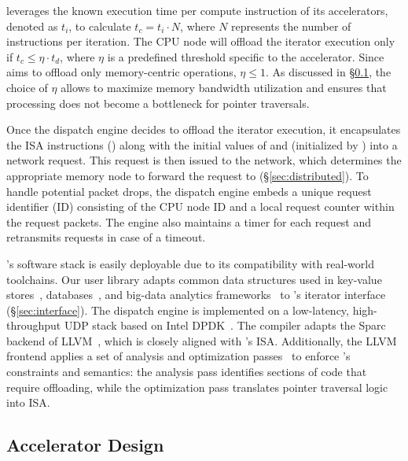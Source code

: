 \pulse leverages the known execution time per compute instruction of its accelerators, denoted as $t_i$, to calculate $t_c = t_i \cdot N$, where $N$ represents the number of instructions per iteration. The CPU node will offload the iterator execution only if $t_c \leq \eta \cdot t_d$, where $\eta$ is a predefined threshold specific to the accelerator. Since \pulse aims to offload only memory-centric operations, $\eta \leq 1$. As discussed in \S\ref{ssec:architecture}, the choice of $\eta$ allows \pulse to maximize memory bandwidth utilization and ensures that processing does not become a bottleneck for pointer traversals.

 Once the dispatch engine decides to offload the iterator execution, it encapsulates the ISA instructions () along with the initial values of  and  (initialized by ) into a network request. This request is then issued to the network, which determines the appropriate memory node to forward the request to (\S\ref{sec:distributed}). To handle potential packet drops, the dispatch engine embeds a unique request identifier (ID) consisting of the CPU node ID and a local request counter within the request packets. The engine also maintains a timer for each request and retransmits requests in case of a timeout.

 \pulse's software stack is easily deployable due to its compatibility with real-world toolchains. Our user library adapts common data structures used in key-value stores~\cite{redis, memcached}, databases~\cite{wiredtiger, btree1, btree2, trie1, trie3}, and big-data analytics frameworks~\cite{powergraph, graphx, graphchi, pagerank} to \pulse's iterator interface (\S\ref{sec:interface}). The \pulse dispatch engine is implemented on a low-latency, high-throughput UDP stack based on Intel DPDK~\cite{dpdk}. The \pulse compiler adapts the Sparc backend of LLVM~\cite{llvmsparc}, which is closely aligned with \pulse's ISA. Additionally, the LLVM frontend applies a set of analysis and optimization passes~\cite{llvmpass} to enforce \pulse's constraints and semantics: the analysis pass identifies sections of code that require offloading, while the optimization pass translates pointer traversal logic into \pulse ISA.



\subsection{\pulse Accelerator Design}
\label{ssec:architecture}

